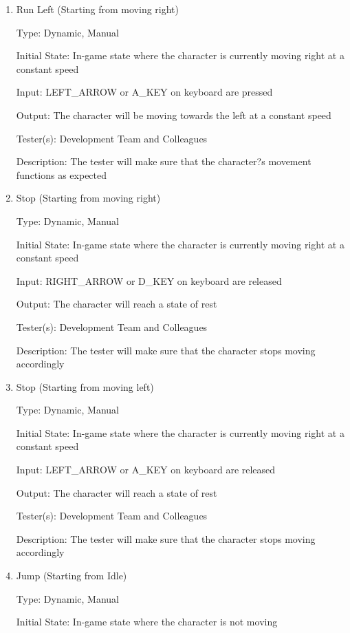 \documentclass[12pt, titlepage]{article}
\begin{document}
\begin{enumerate}
\item{Run Left (Starting from moving right)\\}

Type: Dynamic, Manual

Initial State: In-game state where the character is currently moving right at a constant speed

Input: LEFT\_ARROW or A\_KEY on keyboard are pressed

Output: The character will be moving towards the left at a constant speed

Tester(s): Development Team and Colleagues

Description: The tester will make sure that the character?s movement functions as expected

\item{Stop (Starting from moving right)\\}

Type: Dynamic, Manual

Initial State: In-game state where the character is currently moving right at a constant speed

Input: RIGHT\_ARROW or D\_KEY on keyboard are released

Output: The character will reach a state of rest

Tester(s): Development Team and Colleagues

Description: The tester will make sure that the character stops moving accordingly

\item{Stop (Starting from moving left)\\}

Type: Dynamic, Manual

Initial State: In-game state where the character is currently moving right at a constant speed

Input: LEFT\_ARROW or A\_KEY on keyboard are released

Output: The character will reach a state of rest

Tester(s): Development Team and Colleagues

Description: The tester will make sure that the character stops moving accordingly

\item{Jump (Starting from Idle)\\}

Type: Dynamic, Manual

Initial State: In-game state where the character is not moving


\end{enumerate}
\end{document}
